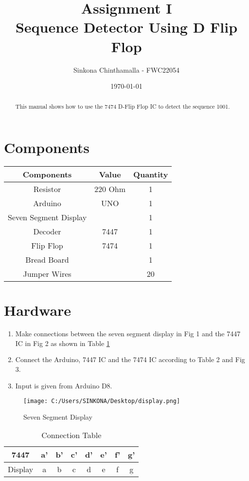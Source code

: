 \documentclass[journal,12pt,twocolumn]{IEEEtran}
\title{Assignment \textrm{I}
\textbf{\\Sequence Detector Using D Flip Flop}}
\author{Sinkona Chinthamalla - FWC22054}
\date{\today}
\begin{document}
\maketitle

\tableofcontents 
\vspace{0.5cm}

\begin{abstract}
This manual shows how to use the 7474 D-Flip Flop IC to detect the sequence 1001.
\end{abstract}

\section{Components}
\begin{tabular}{|c|c|c|}
\hline
Components & Value & Quantity\\
\hline
Resistor & 220 Ohm & 1\\
\hline
Arduino & UNO & 1\\
\hline
Seven Segment Display & & 1\\
\hline
Decoder & 7447 & 1\\
\hline
Flip Flop & 7474 & 1\\
\hline
Bread Board & & 1\\
\hline
Jumper Wires & & 20\\
\hline
\end{tabular}

\section{Hardware}
\begin{enumerate}
\item Make connections between the seven segment display in Fig 1 and the 7447 IC in Fig 2 as shown in Table \ref{table:1}
\item Connect the Arduino, 7447 IC and the 7474 IC according to Table 2 and Fig 3.
\item Input is given from Arduino D8.
\vspace{0.5cm}
\end{enumerate} 

\begin{figure}[h!]
\centering
\texttt{[image: C:/Users/SINKONA/Desktop/display.png]}
\centering
\caption{Seven Segment Display}
\end{figure}


\begin{table}[h]
\Large
\centering
\begin{tabular}{|c|c|c|c|c|c|c|c|}
\hline
7447 & a' & b' & c' & d' & e' & f' & g'\\
\hline
Display & a & b & c & d & e & f & g\\
\hline
\end{tabular}
\caption{Connection Table}
\label{table:1}
\end{table}
\end{document}
